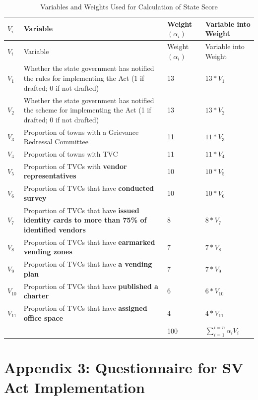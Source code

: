 \documentclass[a4paper, 12pt, twoside]{article}
\begin{document}
{{%
\begin{longtable}[l]{>{\raggedright}p{1.5cm}>{\raggedright}p{6cm}>{\raggedright}p{2.5cm}>{\raggedright\arraybackslash}p{4cm}}
  \caption{Variables and Weights Used for Calculation of State Score}\\
    \toprule
$V_i$ & Variable & Weight $(\alpha_i)$ & Variable into Weight \\
\midrule
\endfirsthead
$V_i$ & Variable & Weight $(\alpha_i)$ & Variable into Weight \\
\midrule
\endhead
\bottomrule
\endfoot
\bottomrule
\endlastfoot
$V_1$ & Whether the state government has notified the rules for implementing the Act (1 if drafted; 0 if not drafted) & 13 & $13 * V_1$\\
$V_2$ & Whether the state government has notified the scheme for implementing the Act (1 if drafted; 0 if not drafted) & 13 & $13 * V_2$\\
$V_3$ & Proportion of towns with a Grievance Redressal Committee & 11 & $11 * V_3$\\
$V_4$ & Proportion of towns with TVC & 11 & $11 * V_4$\\
$V_5$ & Proportion of TVCs with \textbf{vendor representatives} & 10 & $10 * V_5$\\
$V_6$ & Proportion of TVCs that have \textbf{conducted survey} & 10 & $10 * V_6$\\
$V_7$ & Proportion of TVCs that have \textbf{issued identity cards to more than 75\% of identified vendors} & 8 & $8 * V_7$\\
$V_8$ & Proportion of TVCs that have \textbf{earmarked vending zones} & 7 & $7 * V_8$\\
$V_9$ & Proportion of TVCs that have \textbf{a vending plan} & 7 & $7 * V_9$\\
$V_{10}$ & Proportion of TVCs that have \textbf{published a charter} & 6 & $6 * V_{10}$\\
$V_{11}$ & Proportion of TVCs that have \textbf{assigned office space} & 4 & $4 * V_{11}$\\
& & 100 & $\sum_{i = 1}^{i = n} \alpha_i V_i$\\
\end{longtable}

\newpage
\section*{Appendix 3: Questionnaire for SV Act Implementation}
\label{sec: Appendix 5}

}}
\end{document}
